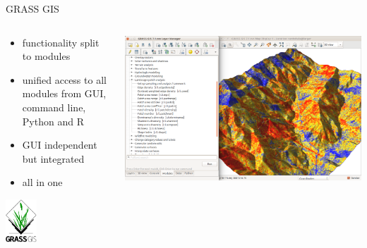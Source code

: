 \documentclass[xcolor={dvipsnames,usenames},beamer,aspectratio=169]{beamer}
\begin{document}
\begin{frame}{GRASS GIS}

\begin{columns}
\begin{column}{0.4\textwidth}

 \begin{itemize}
  \item functionality split to modules
  \item unified access to all modules from GUI, command line, Python and R
  \item GUI independent but integrated
  \item all in one
\end{itemize}

\begin{center}
\includegraphics[width=0.3\textwidth]{logos/grass_gis}
\end{center}

\end{column}
\begin{column}{0.55\textwidth}

\begin{center}
  \includegraphics[width=\textwidth]{grass/count_and_modules}
\end{center}

\end{column}
\end{columns}

\end{frame}
\end{document}
